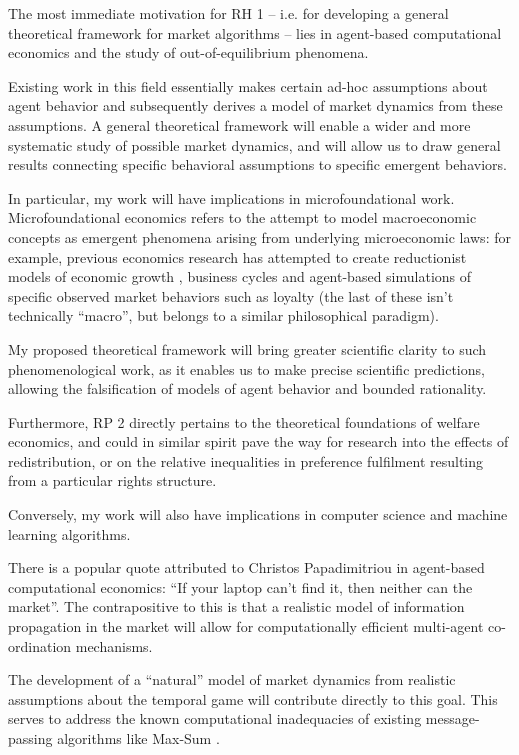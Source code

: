\documentclass{article}
\begin{document}
The most immediate motivation for RH 1 -- i.e. for developing a general theoretical framework for market algorithms -- lies in agent-based computational economics and the study of out-of-equilibrium phenomena. 

Existing work in this field essentially makes certain ad-hoc assumptions about agent behavior \cite{hce:32} and subsequently derives a model of market dynamics from these assumptions. A general theoretical framework will enable a wider and more systematic study of possible market dynamics, and will allow us to draw general results connecting specific behavioral assumptions to specific emergent behaviors.

In particular, my work will have implications in microfoundational work. Microfoundational economics refers to the attempt to model macroeconomic concepts as emergent phenomena arising from underlying microeconomic laws: for example, previous economics research has attempted to create reductionist models of economic growth \cite{growth}, business cycles \cite{cycles} and agent-based simulations of specific observed market behaviors such as loyalty \cite{loyalty} (the last of these isn't technically ``macro'', but belongs to a similar philosophical paradigm).

My proposed theoretical framework will bring greater scientific clarity to such phenomenological work, as it enables us to make precise scientific predictions, allowing the falsification of models of agent behavior and bounded rationality.

Furthermore, RP 2 directly pertains to the theoretical foundations of welfare economics, and could in similar spirit pave the way for research into the effects of redistribution, or on the relative inequalities in preference fulfilment resulting from a particular rights structure.

Conversely, my work will also have implications in computer science and machine learning algorithms. 

There is a popular quote attributed to Christos Papadimitriou in agent-based computational economics: ``If your laptop can't find it, then neither can the market''. The contrapositive to this is that a realistic model of information propagation in the market will allow for computationally efficient multi-agent co-ordination mechanisms. 

The development of a ``natural'' model of market dynamics from realistic assumptions about the temporal game will contribute directly to this goal. This serves to address the known computational inadequacies of existing message-passing algorithms like Max-Sum \cite{khan}. 
\end{document}
